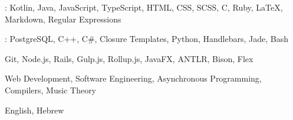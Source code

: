 
\begin{cvparagraph}
    : Kotlin, Java, JavaScript, TypeScript, HTML, CSS, SCSS, C, Ruby, LaTeX, Markdown, Regular Expressions

    : PostgreSQL, C++, C\#, Closure Templates, Python, Handlebars, Jade, Bash

     Git, Node.js, Rails, Gulp.js, Rollup.js, JavaFX, ANTLR, Bison, Flex

     Web Development, Software Engineering, Asynchronous Programming, Compilers, Music Theory

     English, Hebrew
\end{cvparagraph}
